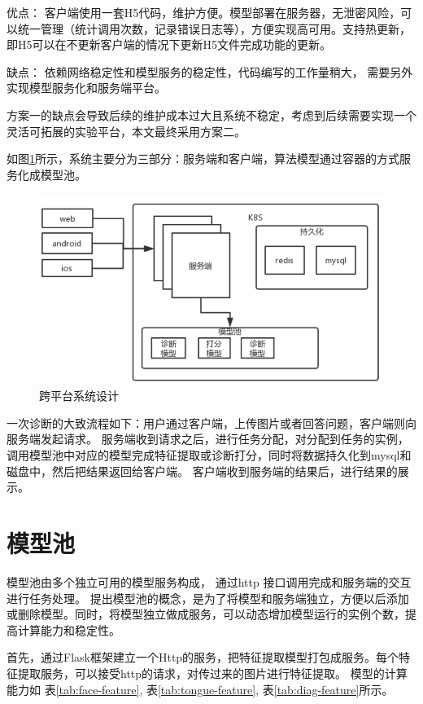 优点： 客户端使用一套H5代码，维护方便。模型部署在服务器，无泄密风险，可以统一管理（统计调用次数，记录错误日志等），方便实现高可用。支持热更新，即H5可以在不更新客户端的情况下更新H5文件完成功能的更新。

缺点： 依赖网络稳定性和模型服务的稳定性，代码编写的工作量稍大， 需要另外实现模型服务化和服务端平台。

方案一的缺点会导致后续的维护成本过大且系统不稳定，考虑到后续需要实现一个灵活可拓展的实验平台，本文最终采用方案二。

如图\ref{fig:system}所示，系统主要分为三部分：服务端和客户端，算法模型通过容器的方式服务化成模型池。

\begin{figure}[ht]
    \centering
    \includegraphics[width=12cm]{images/system.png}
    \caption{跨平台系统设计}
    \label{fig:system}
\end{figure}

一次诊断的大致流程如下：用户通过客户端，上传图片或者回答问题，客户端则向服务端发起请求。
服务端收到请求之后，进行任务分配，对分配到任务的实例，调用模型池中对应的模型完成特征提取或诊断打分，同时将数据持久化到mysql和磁盘中，然后把结果返回给客户端。
客户端收到服务端的结果后，进行结果的展示。

\section{模型池}

模型池由多个独立可用的模型服务构成， 通过http 接口调用完成和服务端的交互进行任务处理。
提出模型池的概念，是为了将模型和服务端独立，方便以后添加或删除模型。同时，将模型独立做成服务，可以动态增加模型运行的实例个数，提高计算能力和稳定性。

首先，通过Flask框架建立一个Http的服务，把特征提取模型打包成服务。每个特征提取服务，可以接受http的请求，对传过来的图片进行特征提取。
模型的计算能力如 表\ref{tab:face-feature}, 表\ref{tab:tongue-feature}, 表\ref{tab:diag-feature}所示。

